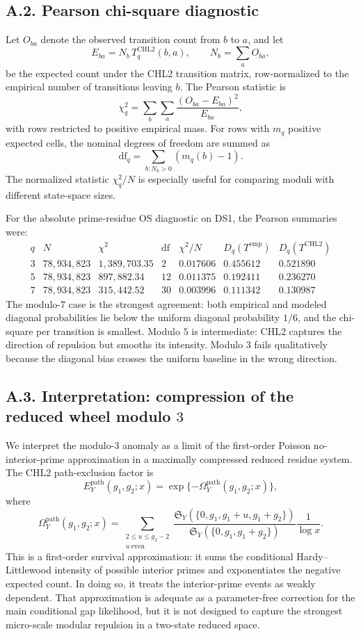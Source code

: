 \documentclass[10pt]{article}
\begin{document}
\subsection*{A.2. Pearson chi-square diagnostic}

Let $O_{ba}$ denote the observed transition count from $b$ to $a$, and let
\[
E_{ba}=N_b\,T_q^{\mathrm{CHL2}}(b,a),
\qquad
N_b=\sum_a O_{ba},
\]
be the expected count under the CHL2 transition matrix, row-normalized to the empirical number of transitions leaving $b$.  The Pearson statistic is
\[
\chi_q^2=\sum_{b}\sum_{a}\frac{(O_{ba}-E_{ba})^2}{E_{ba}},
\]
with rows restricted to positive empirical mass.  For rows with $m_q$ positive expected cells, the nominal degrees of freedom are summed as
\[
\mathrm{df}_q=\sum_{b:N_b>0}(m_q(b)-1).
\]
The normalized statistic $\chi_q^2/N$ is especially useful for comparing moduli with different state-space sizes.

For the absolute prime-residue OS diagnostic on DS1, the Pearson summaries were:
\[
\begin{array}{c|r|r|r|r|r|r}
q & N & \chi^2 & \mathrm{df} & \chi^2/N & D_q(T^{\mathrm{emp}}) & D_q(T^{\mathrm{CHL2}})\\
\hline
3 & 78{,}934{,}823 & 1{,}389{,}703.35 & 2 & 0.017606 & 0.455612 & 0.521890\\
5 & 78{,}934{,}823 & 897{,}882.34 & 12 & 0.011375 & 0.192411 & 0.236270\\
7 & 78{,}934{,}823 & 315{,}442.52 & 30 & 0.003996 & 0.111342 & 0.130987
\end{array}
\]
The modulo-$7$ case is the strongest agreement: both empirical and modeled diagonal probabilities lie below the uniform diagonal probability $1/6$, and the chi-square per transition is smallest.  Modulo $5$ is intermediate: CHL2 captures the direction of repulsion but smooths its intensity.  Modulo $3$ fails qualitatively because the diagonal bias crosses the uniform baseline in the wrong direction.

\subsection*{A.3. Interpretation: compression of the reduced wheel modulo $3$}

We interpret the modulo-$3$ anomaly as a limit of the first-order Poisson no-interior-prime approximation in a maximally compressed reduced residue system.  The CHL2 path-exclusion factor is
\[
E_Y^{\mathrm{path}}(g_1,g_2;x)=\exp\{-\Omega_Y^{\mathrm{path}}(g_1,g_2;x)\},
\]
where
\[
\Omega_Y^{\mathrm{path}}(g_1,g_2;x)=\sum_{\substack{2\le u\le g_2-2\\ u\ \mathrm{even}}}\frac{\mathfrak S_Y(\{0,g_1,g_1+u,g_1+g_2\})}{\mathfrak S_Y(\{0,g_1,g_1+g_2\})}\frac{1}{\log x}.
\]
This is a first-order survival approximation: it sums the conditional Hardy--Littlewood intensity of possible interior primes and exponentiates the negative expected count.  In doing so, it treats the interior-prime events as weakly dependent.  That approximation is adequate as a parameter-free correction for the main conditional gap likelihood, but it is not designed to capture the strongest micro-scale modular repulsion in a two-state reduced space.
\end{document}
